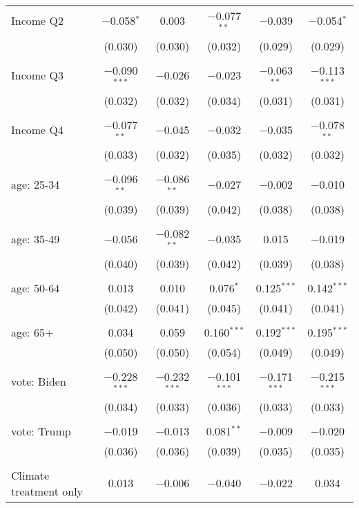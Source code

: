 \begin{tabular}{@{\extracolsep{5pt}}lccccc}
 Income Q2 & $-$0.058$^{*}$ & 0.003 & $-$0.077$^{**}$ & $-$0.039 & $-$0.054$^{*}$ \\ 
  & (0.030) & (0.030) & (0.032) & (0.029) & (0.029) \\ 
  & & & & & \\ 
 Income Q3 & $-$0.090$^{***}$ & $-$0.026 & $-$0.023 & $-$0.063$^{**}$ & $-$0.113$^{***}$ \\ 
  & (0.032) & (0.032) & (0.034) & (0.031) & (0.031) \\ 
  & & & & & \\ 
 Income Q4 & $-$0.077$^{**}$ & $-$0.045 & $-$0.032 & $-$0.035 & $-$0.078$^{**}$ \\ 
  & (0.033) & (0.032) & (0.035) & (0.032) & (0.032) \\ 
  & & & & & \\ 
 age: 25-34 & $-$0.096$^{**}$ & $-$0.086$^{**}$ & $-$0.027 & $-$0.002 & $-$0.010 \\ 
  & (0.039) & (0.039) & (0.042) & (0.038) & (0.038) \\ 
  & & & & & \\ 
 age: 35-49 & $-$0.056 & $-$0.082$^{**}$ & $-$0.035 & 0.015 & $-$0.019 \\ 
  & (0.040) & (0.039) & (0.042) & (0.039) & (0.038) \\ 
  & & & & & \\ 
 age: 50-64 & 0.013 & 0.010 & 0.076$^{*}$ & 0.125$^{***}$ & 0.142$^{***}$ \\ 
  & (0.042) & (0.041) & (0.045) & (0.041) & (0.041) \\ 
  & & & & & \\ 
 age: 65+ & 0.034 & 0.059 & 0.160$^{***}$ & 0.192$^{***}$ & 0.195$^{***}$ \\ 
  & (0.050) & (0.050) & (0.054) & (0.049) & (0.049) \\ 
  & & & & & \\ 
 vote: Biden & $-$0.228$^{***}$ & $-$0.232$^{***}$ & $-$0.101$^{***}$ & $-$0.171$^{***}$ & $-$0.215$^{***}$ \\ 
  & (0.034) & (0.033) & (0.036) & (0.033) & (0.033) \\ 
  & & & & & \\ 
 vote: Trump & $-$0.019 & $-$0.013 & 0.081$^{**}$ & $-$0.009 & $-$0.020 \\ 
  & (0.036) & (0.036) & (0.039) & (0.035) & (0.035) \\ 
  & & & & & \\ 
 Climate treatment only & 0.013 & $-$0.006 & $-$0.040 & $-$0.022 & 0.034 \\ 

\end{tabular}
